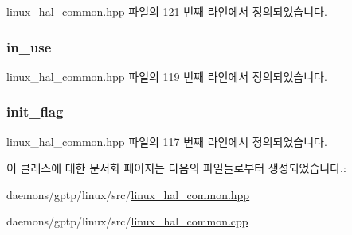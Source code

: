 linux\+\_\+hal\+\_\+common.\+hpp 파일의 121 번째 라인에서 정의되었습니다.

\subsubsection[{\texorpdfstring{in\+\_\+use}{in_use}}]{ in\+\_\+use\hspace{0.3cm}{\ttfamily [private]}}\hypertarget{class_ticketing_lock_a7768b84c51671204cc736430f48246a0}{}\label{class_ticketing_lock_a7768b84c51671204cc736430f48246a0}


linux\+\_\+hal\+\_\+common.\+hpp 파일의 119 번째 라인에서 정의되었습니다.

\subsubsection[{\texorpdfstring{init\+\_\+flag}{init_flag}}]{ init\+\_\+flag\hspace{0.3cm}{\ttfamily [private]}}\hypertarget{class_ticketing_lock_a9298e04a9d0130ff1545e0914d419de5}{}\label{class_ticketing_lock_a9298e04a9d0130ff1545e0914d419de5}


linux\+\_\+hal\+\_\+common.\+hpp 파일의 117 번째 라인에서 정의되었습니다.



이 클래스에 대한 문서화 페이지는 다음의 파일들로부터 생성되었습니다.\+:\begin{DoxyCompactItemize}
\item 
daemons/gptp/linux/src/\hyperlink{linux__hal__common_8hpp}{linux\+\_\+hal\+\_\+common.\+hpp}\item 
daemons/gptp/linux/src/\hyperlink{linux__hal__common_8cpp}{linux\+\_\+hal\+\_\+common.\+cpp}\end{DoxyCompactItemize}
